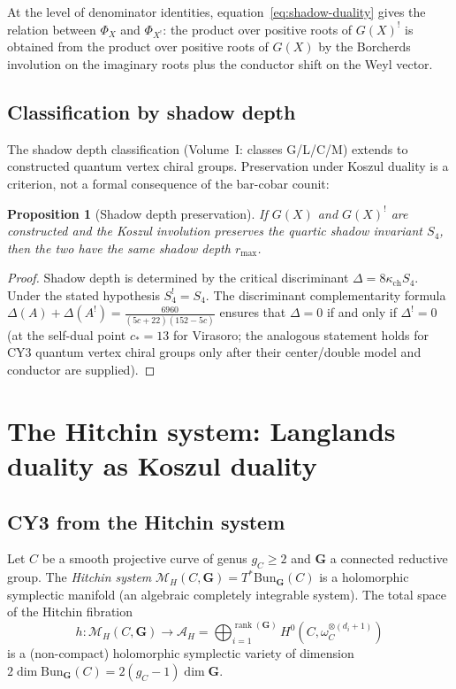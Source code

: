 \documentclass[11pt]{article}
\newtheorem{proposition}[theorem]{Proposition}
\theoremstyle{definition}
\theoremstyle{remark}
\DeclareMathOperator{\rank}{rank}
\newcommand{\cA}{\mathcal{A}}
\newcommand{\cM}{\mathcal{M}}
\begin{document}
At the level of denominator identities, equation~\eqref{eq:shadow-duality}
gives the relation between $\Phi_X$ and $\Phi_{X^!}$: the product
over positive roots of $G(X)^!$ is obtained from the product over
positive roots of $G(X)$ by the Borcherds involution on the
imaginary roots plus the conductor shift on the Weyl vector.

\subsection{Classification by shadow depth}

The shadow depth classification (Volume~I: classes G/L/C/M) extends to
constructed quantum vertex chiral groups. Preservation under Koszul
duality is a criterion, not a formal consequence of the bar-cobar
counit:

\begin{proposition}[Shadow depth preservation]
\label{prop:depth-preservation}
If $G(X)$ and $G(X)^!$ are constructed and the Koszul involution
preserves the quartic shadow invariant $S_4$, then the two have the
same shadow depth $r_{\max}$.
\end{proposition}

\begin{proof}
Shadow depth is determined by the critical discriminant
$\Delta = 8\kappa_{\mathrm{ch}} S_4$. Under the stated hypothesis
$S_4^! = S_4$. The discriminant complementarity formula
$\Delta(A) + \Delta(A^!) = \frac{6960}{(5c+22)(152-5c)}$ ensures
that $\Delta = 0$ if and only if $\Delta^! = 0$ (at the self-dual
point $c_* = 13$ for Virasoro; the analogous statement holds for
CY3 quantum vertex chiral groups only after their center/double model
and conductor are supplied).
\end{proof}


\section{The Hitchin system: Langlands duality as Koszul duality}
\label{sec:hitchin}

\subsection{CY3 from the Hitchin system}

Let $C$ be a smooth projective curve of genus $g_C \geq 2$ and
$\mathbf{G}$ a connected reductive group. The \emph{Hitchin system}
$\cM_H(C, \mathbf{G}) = T^*\mathrm{Bun}_\mathbf{G}(C)$ is a
holomorphic symplectic manifold (an algebraic completely integrable
system). The total space of the Hitchin fibration
\[
h \colon \cM_H(C, \mathbf{G}) \longrightarrow
\cA_H = \bigoplus_{i=1}^{\rank(\mathbf{G})}
H^0(C, \omega_C^{\otimes (d_i + 1)})
\]
is a (non-compact) holomorphic symplectic variety of dimension
$2 \dim \mathrm{Bun}_\mathbf{G}(C) = 2(g_C - 1) \dim \mathbf{G}$.
\end{document}
